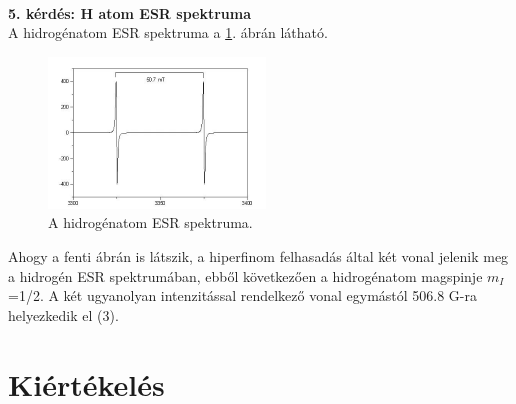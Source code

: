 \documentclass[12pt,a4paper]{article}
\begin{document}
\\
\textbf{5. kérdés: H atom ESR spektruma}\\
A hidrogénatom ESR spektruma a \ref{im-h}. ábrán látható.\\
\begin{figure}[!h]
\centering
\includegraphics[scale=3]{h_spec}
\caption{A hidrogénatom ESR spektruma.}
\label{im-h}
\end{figure}
\newline
Ahogy a fenti ábrán is látszik, a hiperfinom felhasadás által két vonal jelenik meg a hidrogén ESR spektrumában, ebből következően a hidrogénatom magspinje $m_I$=1/2. A két ugyanolyan intenzitással rendelkező vonal egymástól 506.8 G-ra helyezkedik el (3).

\section{Kiértékelés}
\end{document}
